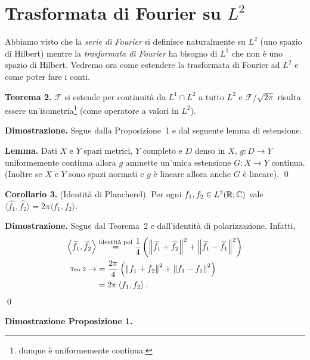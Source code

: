 
\section{Trasformata di Fourier su $L^2$}

Abbiamo visto che la \textit{serie di Fourier} si definisce naturalmente su $L^2$ (uno spazio di Hilbert) mentre la \textit{trasformata di Fourier} ha bisogno di $L^1$ che non è uno spazio di Hilbert. Vedremo ora come estendere la trasformata di Fourier ad $L^2$ e come poter fare i conti.


\textbf{Teorema 2.}
$\mathcal F$ si estende per continuità da $L^1 \cap L^2$ a tutto $L^2$ e $\mathcal F / \sqrt{2\pi}$ risulta essere un'isometria\footnote{dunque è uniformemente continua.} (come operatore a valori in $L^2$).

\textbf{Dimostrazione.} Segue dalla Proposizione~1 e dal seguente lemma di estensione.

\textbf{Lemma.} Dati $X$ e $Y$ spazi metrici, $Y$ completo e $D$ denso in $X$, $g \colon D \to Y$ uniformemente continua allora $g$ ammette un'unica estensione $G \colon X \to Y$ continua. (Inoltre se $X$ e $Y$ sono spazi normati e $g$ è lineare allora anche $G$ è lineare).
\qed

\textbf{Corollario 3.} (Identità di Plancherel).
Per ogni $f_1, f_2 \in L^2(\mathbb R; \mathbb C)$ vale $\langle \hat{f_1}, \hat{f_2} \rangle = 2\pi \langle f_1, f_2 \rangle$.

\textbf{Dimostrazione.} Segue dal Teorema~2 e dall'identità di polarizzazione. 
Infatti, 
\begin{align*}
	\left<\widehat{f_1}, \widehat{f_2} \right>  & \overset{\text{identità pol}}{=} 
	\frac{1}{4} \left( \left\lVert \widehat{f_1} + \widehat{f_2} \right\rVert^2 + \left\lVert \widehat{f_1} - \widehat{f_1} \right\rVert^2 \right) \\
	\substack{\text{Teo~2}} \to & = \frac{2\pi}{4} \left( \left\lVert f_1 + f_2 \right\rVert^2 + \left\lVert f_1 - f_1 \right\rVert^2 \right) \\
	& = 2\pi \left<f_1,f_2 \right>.
\end{align*}
\qed

\vss

\textbf{Dimostrazione Proposizione 1.}

